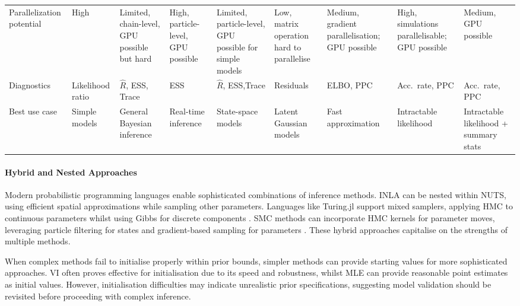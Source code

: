 \documentclass{article}
\begin{document}
\begin{landscape}
\begin{table}[ht]
\begin{tabular}{@{}p{3.5cm}p{1.5cm}p{1.5cm}p{1.5cm}p{1.5cm}p{1.5cm}p{1.5cm}p{1.5cm}p{1.5cm}@{}}
Parallelization potential & 
High & 
Limited, chain-level, GPU possible but hard & 
High, particle-level, GPU possible & 
Limited, particle-level, GPU possible for simple models & 
Low, matrix operation hard to parallelise & 
Medium, gradient parallelisation; GPU possible & 
High, simulations parallelisable; GPU possible & 
Medium, GPU possible \\
Diagnostics & Likelihood ratio & $\hat{R}$, ESS, Trace& ESS & $\hat{R}$, ESS,Trace & Residuals & ELBO, PPC & Acc.~rate, PPC & Acc.~rate, PPC \\
Best use case & Simple models & General Bayesian inference & Real-time inference & State-space models & Latent Gaussian models & Fast approximation & Intractable likelihood & Intractable likelihood + summary stats \\
\bottomrule
\end{tabular}
\end{table}
\end{landscape}


\paragraph{Hybrid and Nested Approaches}

Modern probabilistic programming languages enable sophisticated combinations of inference methods.
INLA can be nested within NUTS, using efficient spatial approximations while sampling other parameters.
Languages like Turing.jl support mixed samplers, applying HMC to continuous parameters whilst using Gibbs for discrete components \citet{fjelde2025turing}.
SMC methods can incorporate HMC kernels for parameter moves, leveraging particle filtering for states and gradient-based sampling for parameters \citet{buchholz2021adaptive, devlin2024no, rosato2024enhanced}.
These hybrid approaches capitalise on the strengths of multiple methods.

When complex methods fail to initialise properly within prior bounds, simpler methods can provide starting values for more sophisticated approaches.
VI often proves effective for initialisation due to its speed and robustness, whilst MLE can provide reasonable point estimates as initial values.
However, initialisation difficulties may indicate unrealistic prior specifications, suggesting model validation should be revisited before proceeding with complex inference.
\end{document}
